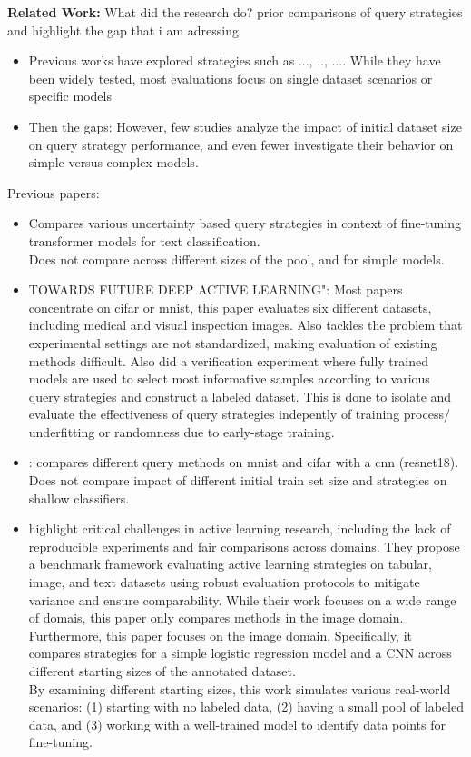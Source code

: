 \documentclass{article}
\theoremstyle{plain}
\theoremstyle{definition}
\theoremstyle{remark}
\begin{document}
\textbf{Related Work: }What did the research do? prior comparisons of query strategies and highlight the gap that i am adressing
\begin{itemize}
	\item Previous works have explored strategies such as ..., .., .... While they have been widely tested, most evaluations focus on  single dataset scenarios or specific models
	\item Then the gaps: However, few studies analyze the impact of initial dataset size on query strategy performance, and even fewer investigate their behavior on simple versus complex models.
\end{itemize}
Previous papers:
\begin{itemize}
	\item \cite{revisitinguncertaintybasedquerystrategies} Compares various uncertainty based query strategies in context of fine-tuning transformer models for text classification. 
	\\
	Does not compare across different sizes of the pool, and for simple models.
	\item \cite{benchmarkingofquerystrategies} TOWARDS FUTURE
	DEEP ACTIVE LEARNING": Most papers concentrate on cifar or mnist, this paper evaluates six different datasets, including medical and visual inspection images. Also tackles the problem that experimental settings are not standardized, making evaluation of existing methods difficult. Also did a verification experiment where fully trained models are used to select most informative samples according to various query strategies and construct a labeled dataset. This is done to isolate and evaluate the effectiveness of query strategies indepently of training process/ underfitting or randomness due to early-stage training. 

	\item \cite{comparativesurveydeepactive}: compares different query methods on mnist and cifar with a cnn (resnet18). Does not compare impact of different initial train set size and strategies on shallow classifiers.


	\item \cite{comparableactivelearning} highlight critical challenges in active learning research, including the lack of reproducible experiments and fair comparisons across domains. They propose a benchmark framework evaluating active learning strategies on tabular, image, and text datasets using robust evaluation protocols to mitigate variance and ensure comparability. While their work focuses on a wide range of domais, this paper only compares methods in the image domain. Furthermore, this paper focuses on the image domain. Specifically, it compares strategies for a simple logistic regression model and a CNN across different starting sizes of the annotated dataset. \\
	By examining different starting sizes, this work simulates various real-world scenarios: (1) starting with no labeled data, (2) having a small pool of labeled data, and (3) working with a well-trained model to identify data points for fine-tuning.
\end{itemize}
\end{document}
